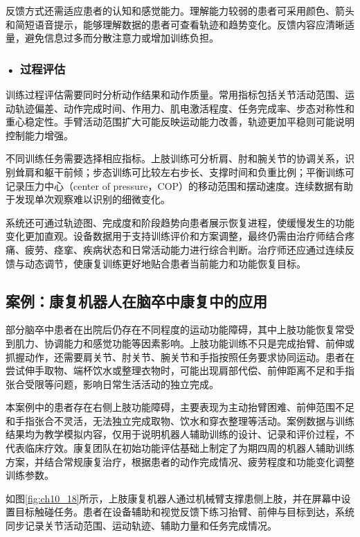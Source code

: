 反馈方式还需适应患者的认知和感觉能力。理解能力较弱的患者可采用颜色、箭头和简短语音提示，能够理解数据的患者可查看轨迹和趋势变化。反馈内容应清晰适量，避免信息过多而分散注意力或增加训练负担。

\subsubsection*{\textbf{• 过程评估}}

训练过程评估需要同时分析动作结果和动作质量。常用指标包括关节活动范围、运动轨迹偏差、动作完成时间、作用力、肌电激活程度、任务完成率、步态对称性和重心稳定性。手臂活动范围扩大可能反映运动能力改善，轨迹更加平稳则可能说明控制能力增强。

不同训练任务需要选择相应指标。上肢训练可分析肩、肘和腕关节的协调关系，识别耸肩和躯干前倾；步态训练可比较左右步长、支撑时间和负重比例；平衡训练可记录压力中心（center of pressure，COP）的移动范围和摆动速度。连续数据有助于发现单次观察难以识别的细微变化。

系统还可通过轨迹图、完成度和阶段趋势向患者展示恢复进程，使缓慢发生的功能变化更加直观。设备数据用于支持训练评价和方案调整，最终仍需由治疗师结合疼痛、疲劳、痉挛、疾病状态和日常活动能力进行综合判断。治疗师还应通过连续反馈与动态调节，使康复训练更好地贴合患者当前能力和功能恢复目标。

\subsection{案例：康复机器人在脑卒中康复中的应用}
部分脑卒中患者在出院后仍存在不同程度的运动功能障碍，其中上肢功能恢复常受到肌力、协调能力和感觉功能等因素影响。上肢功能训练不只是完成抬臂、前伸或抓握动作，还需要肩关节、肘关节、腕关节和手指按照任务要求协同运动。患者在尝试伸手取物、端杯饮水或整理衣物时，可能出现肩部代偿、前伸距离不足和手指张合受限等问题，影响日常生活活动的独立完成。

本案例中的患者存在右侧上肢功能障碍，主要表现为主动抬臂困难、前伸范围不足和手指张合不灵活，无法独立完成取物、饮水和穿衣整理等活动。案例数据与训练结果均为教学模拟内容，仅用于说明机器人辅助训练的设计、记录和评价过程，不代表临床疗效。康复团队在初始功能评估基础上制定了为期四周的机器人辅助训练方案，并结合常规康复治疗，根据患者的动作完成情况、疲劳程度和功能变化调整训练参数。


如图\ref{fig:ch10_18}所示，上肢康复机器人通过机械臂支撑患侧上肢，并在屏幕中设置目标触碰任务。患者在设备辅助和视觉反馈下练习抬臂、前伸与目标到达，系统同步记录关节活动范围、运动轨迹、辅助力量和任务完成情况。

\par
\noindent\begin{minipage}{\textwidth}
\centering
{}
\label{fig:ch10_18}
\end{minipage}
\par


